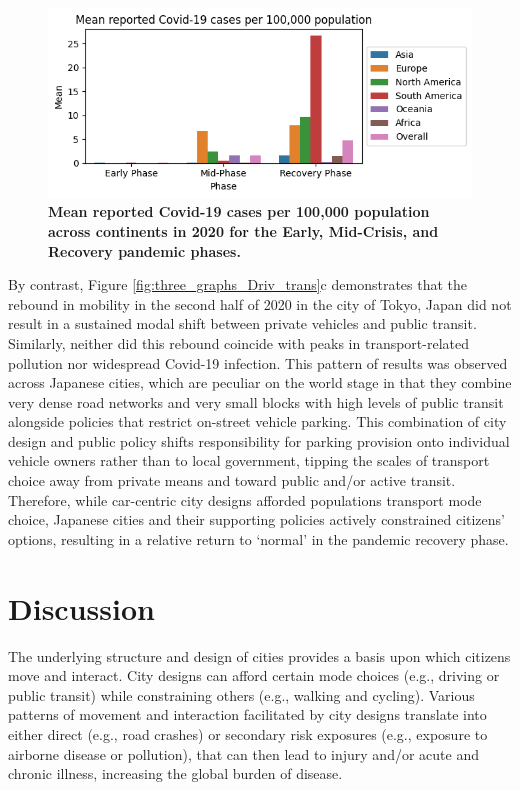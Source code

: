 \documentclass[preprint,12pt]{elsarticle}
\begin{document}
\begin{figure}
\centering

\includegraphics[trim={0 0 0 0},clip,scale=0.8]{Images/covidCases7Ave_plot.png}
\caption{\bf Mean reported Covid-19 cases per 100,000 population across  continents in 2020 for the Early, Mid-Crisis, and Recovery pandemic phases.}  
 \label{fig:covidCases7Ave}\label{fig:Heatmap250PM}
\end{figure}

By contrast, Figure \ref{fig:three_graphs_Driv_trans}c demonstrates that the rebound in mobility in the second half of 2020 in the city of Tokyo, Japan did not result in a sustained modal shift between private vehicles and public transit. Similarly, neither did this rebound coincide with peaks in transport-related pollution nor widespread Covid-19 infection. This pattern of results was observed across Japanese cities, which are peculiar on the world stage in that they combine very dense road networks and very small blocks with high levels of public transit alongside policies that restrict on-street vehicle parking\cite{clements2019socialising}. This combination of city design and public policy shifts responsibility for parking provision onto individual vehicle owners rather than to local government, tipping the scales of transport choice away from private means and toward public and/or active transit. Therefore, while car-centric city designs afforded populations transport mode choice, Japanese cities and their supporting policies actively constrained citizens' options, resulting in a relative return to `normal' in the pandemic recovery phase.


\section*{Discussion}
The underlying structure and design of cities provides a basis upon which citizens move and interact. City designs can afford certain mode choices (e.g., driving or public transit) while constraining others (e.g., walking and cycling). Various patterns of movement and interaction facilitated by city designs translate into either direct (e.g., road crashes) or secondary risk exposures (e.g., exposure to airborne disease or pollution), that can then lead to injury and/or acute and chronic illness, increasing the global burden of disease.
\end{document}
